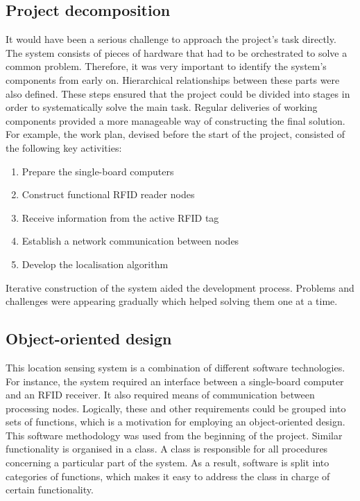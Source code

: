 \subsection{Project decomposition}

It would have been a serious challenge to approach the project's task directly. The system consists of pieces of hardware that had to be orchestrated to solve a common problem. Therefore, it was very important to identify the system's components from early on. Hierarchical relationships between these parts were also defined. These steps ensured that the project could be divided into stages in order to systematically solve the main task. Regular deliveries of working components provided a more manageable way of constructing the final solution. For example, the work plan, devised before the start of the project, consisted of the following key activities:

\begin{enumerate}
 	\item Prepare the single-board computers
 	\item Construct functional RFID reader nodes
 	\item Receive information from the active RFID tag
 	\item Establish a network communication between nodes
 	\item Develop the localisation algorithm
 \end{enumerate}

Iterative construction of the system aided the development process. Problems and challenges were appearing gradually which helped solving them one at a time. 

\subsection{Object-oriented design}

This location sensing system is a combination of different software technologies. For instance, the system required an interface between a single-board computer and an RFID receiver. It also required means of communication between processing nodes. Logically, these and other requirements could be grouped into sets of functions, which is a motivation for employing an object-oriented design. This software methodology was used from the beginning of the project. Similar functionality is organised in a class. A class is responsible for all procedures concerning a particular part of the system. As a result, software is split into categories of functions, which makes it easy to address the class in charge of certain functionality.

